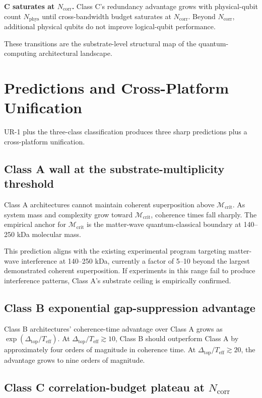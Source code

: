 \documentclass[11pt,a4paper]{article}
\begin{document}
\textbf{C saturates at $N_{\mathrm{corr}}$.} Class C's redundancy advantage grows with physical-qubit count $N_{\mathrm{phys}}$ until cross-bandwidth budget saturates at $N_{\mathrm{corr}}$. Beyond $N_{\mathrm{corr}}$, additional physical qubits do not improve logical-qubit performance.

These transitions are the substrate-level structural map of the quantum-computing architectural landscape.

\section{Predictions and Cross-Platform Unification}

UR-1 plus the three-class classification produces three sharp predictions plus a cross-platform unification.

\subsection{Class A wall at the substrate-multiplicity threshold}

Class A architectures cannot maintain coherent superposition above $\mathcal{M}_{\mathrm{crit}}$. As system mass and complexity grow toward $\mathcal{M}_{\mathrm{crit}}$, coherence times fall sharply. The empirical anchor for $\mathcal{M}_{\mathrm{crit}}$ is the matter-wave quantum-classical boundary at 140--250 kDa molecular mass.

This prediction aligns with the existing experimental program targeting matter-wave interference at 140--250 kDa, currently a factor of 5--10 beyond the largest demonstrated coherent superposition. If experiments in this range fail to produce interference patterns, Class A's substrate ceiling is empirically confirmed.

\subsection{Class B exponential gap-suppression advantage}

Class B architectures' coherence-time advantage over Class A grows as $\exp(\Delta_{\mathrm{top}}/T_{\mathrm{eff}})$. At $\Delta_{\mathrm{top}}/T_{\mathrm{eff}} \gtrsim 10$, Class B should outperform Class A by approximately four orders of magnitude in coherence time. At $\Delta_{\mathrm{top}}/T_{\mathrm{eff}} \gtrsim 20$, the advantage grows to nine orders of magnitude.

\subsection{Class C correlation-budget plateau at $N_{\mathrm{corr}}$}
\end{document}
